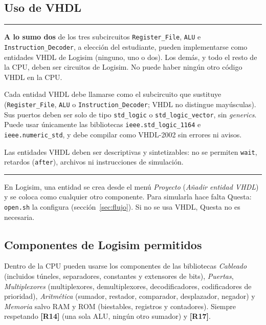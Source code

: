 \documentclass[11pt,a4paper]{article}
\newcommand{\sig}[1]{\texttt{#1}}
\newcommand{\req}[1]{\textbf{[#1]}}
\newenvironment{obligatorio}{\begin{center}\begin{minipage}{0.95\linewidth}\hrule\smallskip}{\smallskip\hrule\end{minipage}\end{center}}
\begin{document}
\subsection{Uso de VHDL}

\begin{obligatorio}
\begin{description}[leftmargin=1.2cm,style=nextline]
\item[\req{R18}] \textbf{A lo sumo dos} de los tres subcircuitos \sig{Register\_File}, \sig{ALU} e \sig{Instruction\_Decoder}, a elección del estudiante, pueden implementarse como entidades VHDL de Logisim (ninguno, uno o dos). Los demás, y todo el resto de la CPU, deben ser circuitos de Logisim. No puede haber ningún otro código VHDL en la CPU.
\item[\req{R19}] Cada entidad VHDL debe llamarse como el subcircuito que sustituye (\sig{Register\_File}, \sig{ALU} o \sig{Instruction\_Decoder}; VHDL no distingue mayúsculas). Sus puertos deben ser solo de tipo \sig{std\_logic} o \sig{std\_logic\_vector}, sin \emph{generics}. Puede usar únicamente las bibliotecas \sig{ieee.std\_logic\_1164} e \sig{ieee.numeric\_std}, y debe compilar como VHDL-2002 sin errores ni avisos.
\item[\req{R20}] Las entidades VHDL deben ser descriptivas y sintetizables: no se permiten \sig{wait}, retardos (\sig{after}), archivos ni instrucciones de simulación.
\end{description}
\end{obligatorio}

\noindent En Logisim, una entidad se crea desde el menú \emph{Proyecto} (\emph{Añadir entidad VHDL}) y se coloca como cualquier otro componente. Para simularla hace falta Questa: \sig{open.sh} la configura (sección~\ref{sec:flujo}). Si no se usa VHDL, Questa no es necesaria.

\subsection{Componentes de Logisim permitidos}

Dentro de la CPU pueden usarse los componentes de las bibliotecas \emph{Cableado} (incluidos túneles, separadores, constantes y extensores de bits), \emph{Puertas}, \emph{Multiplexores} (multiplexores, demultiplexores, decodificadores, codificadores de prioridad), \emph{Aritmética} (sumador, restador, comparador, desplazador, negador) y \emph{Memoria} salvo RAM y ROM (biestables, registros y contadores). Siempre respetando \req{R14} (una sola ALU, ningún otro sumador) y \req{R17}.
\end{document}
